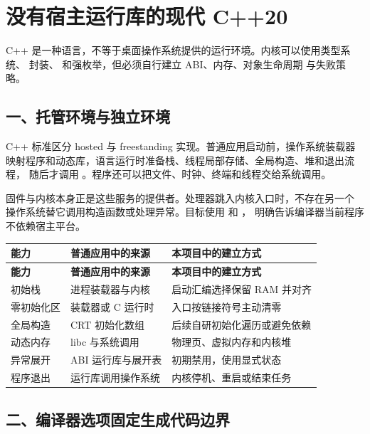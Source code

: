 \chapter{没有宿主运行库的现代 C++20}

\begin{keyidea}
C++ 是一种语言，不等于桌面操作系统提供的运行环境。内核可以使用类型系统、
封装、 和强枚举，但必须自行建立 ABI、内存、对象生命周期
与失败策略。
\end{keyidea}

\section{一、托管环境与独立环境}

C++ 标准区分 hosted 与 freestanding 实现。普通应用启动前，操作系统装载器
映射程序和动态库，语言运行时准备栈、线程局部存储、全局构造、堆和退出流程，
随后才调用 。程序还可以把文件、时钟、终端和线程交给系统调用。

固件与内核本身正是这些服务的提供者。处理器跳入内核入口时，不存在另一个
操作系统替它调用构造函数或处理异常。目标使用
 和 ，
明确告诉编译器当前程序不依赖宿主平台。

\begin{longtable}{L{0.23\textwidth}L{0.29\textwidth}L{0.32\textwidth}}
\toprule
\textbf{能力} & \textbf{普通应用中的来源} & \textbf{本项目中的建立方式}\\
\midrule
\endfirsthead
\toprule
\textbf{能力} & \textbf{普通应用中的来源} & \textbf{本项目中的建立方式}\\
\midrule
\endhead
初始栈 & 进程装载器与内核 & 启动汇编选择保留 RAM 并对齐\\
零初始化区 & 装载器或 C 运行时 & 入口按链接符号主动清零\\
全局构造 & CRT 初始化数组 & 后续自研初始化遍历或避免依赖\\
动态内存 & libc 与系统调用 & 物理页、虚拟内存和内核堆\\
异常展开 & ABI 运行库与展开表 & 初期禁用，使用显式状态\\
程序退出 & 运行库调用操作系统 & 内核停机、重启或结束任务\\
\bottomrule
\end{longtable}

\section{二、编译器选项固定生成代码边界}

